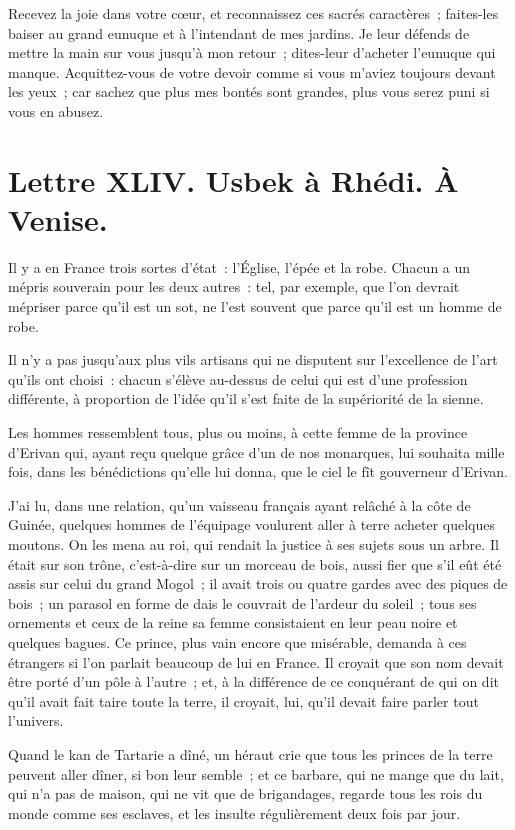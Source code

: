 \documentclass[french,twoside]{book} %
\newcommand{\dateline}[1]{\medskip{\RaggedLeft{#1}\par}\bigskip}
\begin{document}
\noindent Recevez la joie dans votre cœur, et reconnaissez ces sacrés caractères ; faites-les baiser au grand eunuque et à l’intendant de mes jardins. Je leur défends de mettre la main sur vous jusqu’à mon retour ; dites-leur d’acheter l’eunuque qui manque. Acquittez-vous de votre devoir comme si vous m’aviez toujours devant les yeux ; car sachez que plus mes bontés sont grandes, plus vous serez puni si vous en abusez.\par

\dateline{De Paris, le 25 de la lune de Rhégeb, 1713.}
\section[{Lettre XLIV. Usbek à Rhédi. À Venise.}]{Lettre XLIV. Usbek à Rhédi. À Venise.}\renewcommand{\leftmark}{Lettre XLIV. Usbek à Rhédi. À Venise.}

\noindent Il y a en France trois sortes d’état : l’Église, l’épée et la robe. Chacun a un mépris souverain pour les deux autres : tel, par exemple, que l’on devrait mépriser parce qu’il est un sot, ne l’est souvent que parce qu’il est un homme de robe.\par
Il n’y a pas jusqu’aux plus vils artisans qui ne disputent sur l’excellence de l’art qu’ils ont choisi : chacun s’élève au-dessus de celui qui est d’une profession différente, à proportion de l’idée qu’il s’est faite de la supériorité de la sienne.\par
Les hommes ressemblent tous, plus ou moins, à cette femme de la province d’Erivan qui, ayant reçu quelque grâce d’un de nos monarques, lui souhaita mille fois, dans les bénédictions qu’elle lui donna, que le ciel le fît gouverneur d’Erivan.\par
J’ai lu, dans une relation, qu’un vaisseau français ayant relâché à la côte de Guinée, quelques hommes de l’équipage voulurent aller à terre acheter quelques moutons. On les mena au roi, qui rendait la justice à ses sujets sous un arbre. Il était sur son trône, c’est-à-dire sur un morceau de bois, aussi fier que s’il eût été assis sur celui du grand Mogol ; il avait trois ou quatre gardes avec des piques de bois ; un parasol en forme de dais le couvrait de l’ardeur du soleil ; tous ses ornements et ceux de la reine sa femme consistaient en leur peau noire et quelques bagues. Ce prince, plus vain encore que misérable, demanda à ces étrangers si l’on parlait beaucoup de lui en France. Il croyait que son nom devait être porté d’un pôle à l’autre ; et, à la différence de ce conquérant de qui on dit qu’il avait fait taire toute la terre, il croyait, lui, qu’il devait faire parler tout l’univers.\par
Quand le kan de Tartarie a dîné, un héraut crie que tous les princes de la terre peuvent aller dîner, si bon leur semble ; et ce barbare, qui ne mange que du lait, qui n’a pas de maison, qui ne vit que de brigandages, regarde tous les rois du monde comme ses esclaves, et les insulte régulièrement deux fois par jour.\par
\end{document}
